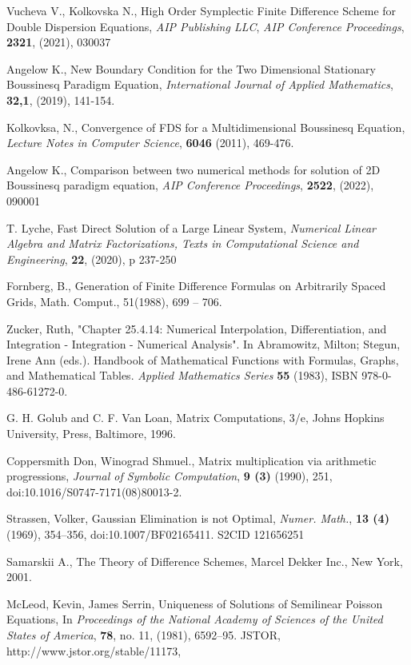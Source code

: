 \documentclass[a5paper]{article}
\theoremstyle{remark}
\begin{document}
\begin{normalsize}
\begin{thebibliography}{99}
	 Vucheva V., Kolkovska N., High Order Symplectic Finite Difference Scheme for Double Dispersion Equations, {\it AIP Publishing LLC}, \emph{AIP Conference Proceedings}, \textbf{2321}, (2021), 030037

	 Angelow K., New Boundary Condition for the Two Dimensional Stationary Boussinesq Paradigm Equation, 
{\it International Journal of Applied Mathematics}, \textbf{32,1}, (2019), 141-154.

	 Kolkovksa, N., Convergence of FDS for a Multidimensional Boussinesq Equation, {\it Lecture Notes in Computer Science}, \textbf{6046} (2011), 469-476.

	 Angelow K., Comparison between two numerical methods for solution of 2D Boussinesq paradigm equation, \emph{AIP Conference Proceedings}, \textbf{2522}, (2022), 090001

	 T. Lyche, Fast Direct Solution of a Large Linear System,
{\it Numerical Linear Algebra and Matrix Factorizations, Texts in Computational Science and Engineering}, \textbf{22}, (2020), p 237-250

	 Fornberg, B., Generation of Finite Difference Formulas on Arbitrarily Spaced Grids, 
Math. Comput., 51(1988),  699 -- 706.

	 Zucker, Ruth, "Chapter 25.4.14: Numerical Interpolation, Differentiation, and Integration - Integration - Numerical Analysis". In Abramowitz, Milton; Stegun, Irene Ann (eds.). Handbook of Mathematical Functions with Formulas, Graphs, and Mathematical Tables. 
{\it Applied Mathematics Series} \textbf{55}  (1983), ISBN 978-0-486-61272-0.

	 G. H. Golub and C. F. Van Loan, Matrix Computations, 3/e, Johns Hopkins University, Press, Baltimore, 1996.

	 Coppersmith Don, Winograd Shmuel., Matrix multiplication via arithmetic progressions,
{\it  Journal of Symbolic Computation}, \textbf{9 (3)} (1990), 251, doi:10.1016/S0747-7171(08)80013-2.

	 Strassen, Volker, Gaussian Elimination is not Optimal,
{\it Numer. Math.}, \textbf{13 (4)} (1969), 354–356, doi:10.1007/BF02165411. S2CID 121656251

	 Samarskii A., The Theory of Difference Schemes, Marcel Dekker Inc., New York, 2001.

	 McLeod, Kevin, James Serrin, Uniqueness of Solutions of Semilinear Poisson Equations, In {\it Proceedings of the National Academy of Sciences of the United States of America}, \textbf{78}, no. 11, (1981), 6592–95. JSTOR, http://www.jstor.org/stable/11173,


\end{thebibliography}
\end{normalsize}
\end{document}
